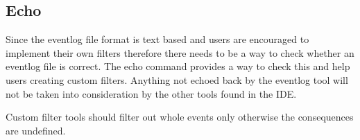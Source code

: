\subsection{Echo}
Since the eventlog file format is text based and users are encouraged to implement their
own filters therefore there needs to be a way to check whether an eventlog file is
correct. The echo command provides a way to check this and help users creating custom
filters. Anything not echoed back by the eventlog tool will not be taken into
consideration by the other tools found in the {\opp} IDE.
\begin{note}
Custom filter tools should filter out whole events only otherwise the consequences are
undefined.
\end{note}

